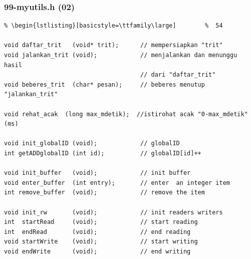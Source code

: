 \documentclass[aspectratio=169, xcolor=table, notheorems, hyperref={pdfpagelabels=false}]{beamer}
\begin{document}
\begin{frame}[fragile]
\frametitle{99-myutils.h (02)}
\begin{lstlisting}[basicstyle=\ttfamily\footnotesize] %  72
% \begin{lstlisting}[basicstyle=\ttfamily\small]        %  65
% \begin{lstlisting}[basicstyle=\ttfamily\large]        %  54

void daftar_trit   (void* trit);      // mempersiapkan "trit"
void jalankan_trit (void);            // menjalankan dan menunggu hasil 
                                      // dari "daftar_trit"
void beberes_trit  (char* pesan);     // beberes menutup "jalankan_trit"

void rehat_acak  (long max_mdetik);  //istirohat acak "0-max_mdetik"(ms)

void init_globalID (void);            // globalID
int getADDglobalID (int id);          // globalID[id]++

void init_buffer   (void);            // init buffer
void enter_buffer  (int entry);       // enter  an integer item 
int remove_buffer  (void);            // remove the item

void init_rw       (void);            // init readers writers
int  startRead     (void);            // start reading
int  endRead       (void);            // end reading
void startWrite    (void);            // start writing
void endWrite      (void);            // end writing

\end{lstlisting}
\end{frame}

\end{document}
